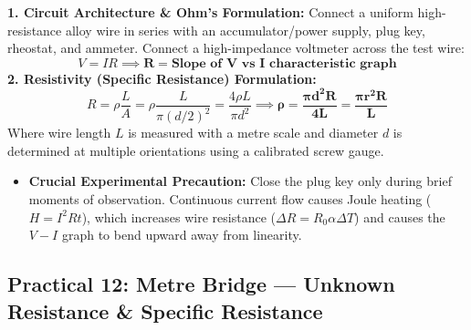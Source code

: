 \documentclass[10pt,twoside,openright]{book}
\begin{document}
\begin{formulabox}
\textbf{1. Circuit Architecture \& Ohm's Formulation:}
Connect a uniform high-resistance alloy wire in series with an accumulator/power supply, plug key, rheostat, and ammeter. Connect a high-impedance voltmeter across the test wire:
\begin{equation}
  V = I R \implies \mathbf{R = \text{Slope of } V \text{ vs } I \text{ characteristic graph}}
\end{equation}
\textbf{2. Resistivity (Specific Resistance) Formulation:}
\begin{equation}
  R = \rho \frac{L}{A} = \rho \frac{L}{\pi (d/2)^2} = \frac{4 \rho L}{\pi d^2} \implies \mathbf{\rho = \frac{\pi d^2 R}{4 L} = \frac{\pi r^2 R}{L}}
\end{equation}
Where wire length $L$ is measured with a metre scale and diameter $d$ is determined at multiple orientations using a calibrated screw gauge.
\begin{itemize}
  \item \textbf{Crucial Experimental Precaution:} Close the plug key only during brief moments of observation. Continuous current flow causes Joule heating ($H = I^2 R t$), which increases wire resistance ($\Delta R = R_0 \alpha \Delta T$) and causes the $V-I$ graph to bend upward away from linearity.
\end{itemize}
\end{formulabox}

\subsection{Practical 12: Metre Bridge --- Unknown Resistance \& Specific Resistance}
\end{document}
